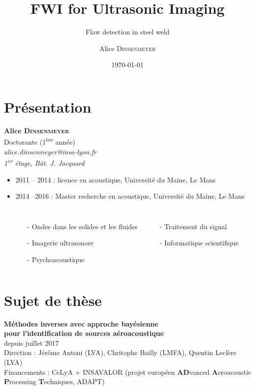 \documentclass[11pt,xcolor=x11names,compress, notes=show]{beamer}%
\author{Alice \textsc{Dinsenmeyer} }
\title{FWI for Ultrasonic Imaging}
\subtitle{Flaw detection in steel weld}
\date{\small \today}
\begin{document}
\section{Présentation}


\begin{frame}
	\begin{center}
		\textbf{Alice \textsc{Dinsenmeyer}}\\
		\footnotesize{Doctorante (1\textsuperscript{ère} année)\\[0.5cm]
		\textit{alice.dinsenmeyer@insa-lyon.fr\\
		1\textsuperscript{er} étage, Bât. J. Jacquard}}
			
	\end{center}
	\begin{itemize}
		\item 2011 -- 2014 : licence en acoustique, Université du Maine, Le Mans %
		\item 2014 --2016 : Master recherche en acoustique, Université du Maine, Le Mans %
		\begin{columns}
			\hspace{2cm}
			\begin{itemize}
				\item[-] Ondes dans les solides et les fluides
				\item[-] Imagerie ultrasonore
				\item[-] Psychoacoustique
			\end{itemize}
			\begin{itemize}
				\item[-] Traitement du signal
				\item[-] Informatique scientifique
			\end{itemize}
		\end{columns}
	\end{itemize}
\end{frame}

\section{Sujet de thèse}


\begin{frame}
	\centering
	\textbf{ Méthodes inverses avec approche bayésienne \\pour l'identification de sources aéroacoustique}\\
	\footnotesize{depuis juillet 2017}\\[0.5cm]
	Direction : Jérôme Antoni (LVA), Chritophe Bailly (LMFA), Quentin Leclère (LVA)\\[0.5cm]
	Financements : CeLyA + INSAVALOR (projet européen \textbf{AD}vanced \textbf{A}eroacoustic \textbf{P}rocessing \textbf{T}echniques, ADAPT)
\end{frame}
\end{document}
